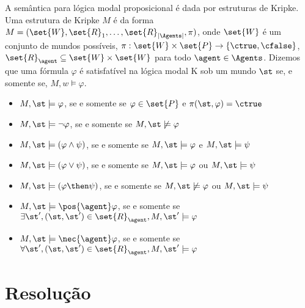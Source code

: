 A semântica para lógica modal proposicional é dada por estruturas de Kripke. Uma estrutura de Kripke $M$ é da forma $M = (\set{W}, \set{R}_1, \ldots, \set{R}_{|\Agents|}, \pi)$, onde %
$\set{W}$ é um conjunto de mundos possíveis, $\pi:\set{W} \times \set{P} \rightarrow \{\ctrue, \cfalse\}$, $\set{R}_\agent \subseteq \set{W} \times \set{W}$ para todo $\agent \in \Agents$. Dizemos que uma fórmula $\varphi$ é satisfatível na lógica modal K sob um mundo $\st$ se, e somente se, $M,w \models \varphi$.

\begin{itemize}
\item $M,\st \models \varphi$, se e somente se $\varphi \in \set{P}$ e $\pi(\st, \varphi) = \ctrue$
\item $M,\st \models \neg\varphi$, se e somente se $M,\st \not\models \varphi$
\item $M,\st \models (\varphi \land \psi)$, se e somente se $M,\st \models \varphi$ e $M,\st \models \psi $
\item $M,\st \models (\varphi \lor \psi)$, se e somente se $M,\st \models \varphi$ ou $M,\st \models \psi $
\item $M,\st \models (\varphi \then \psi)$, se e somente se $M,\st \not\models \varphi$ ou $M,\st \models \psi $

\item $M,\st \models \pos{\agent}\varphi$, se e somente se $\exists\st', (\st, \st') \in \set{R}_\agent, M,\st' \models \varphi$
\item $M,\st \models \nec{\agent}\varphi$, se e somente se $\forall\st', (\st, \st') \in \set{R}_\agent, M,\st' \models \varphi$

\end{itemize}


\section{Resolução}


